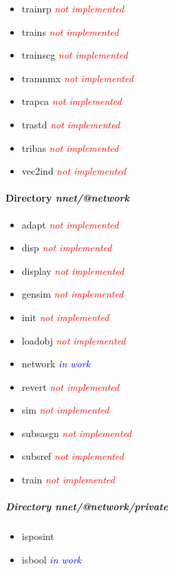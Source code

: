 \begin{itemize}
	\item trainrp \textcolor{red}{\textit{not implemented}}
	\item trains \textcolor{red}{\textit{not implemented}}
	\item trainscg \textcolor{red}{\textit{not implemented}}
	\item tramnmx \textcolor{red}{\textit{not implemented}}
	\item trapca \textcolor{red}{\textit{not implemented}}
	\item trastd \textcolor{red}{\textit{not implemented}}
	\item tribas \textcolor{red}{\textit{not implemented}}
	\item vec2ind \textcolor{red}{\textit{not implemented}}
\end{itemize} 

\paragraph{Directory \textit{nnet/@network}}
\begin{itemize}
	\item adapt \textcolor{red}{\textit{not implemented}}
	\item disp \textcolor{red}{\textit{not implemented}}
	\item display \textcolor{red}{\textit{not implemented}}
	\item gensim \textcolor{red}{\textit{not implemented}}
	\item init \textcolor{red}{\textit{not implemented}}
	\item loadobj \textcolor{red}{\textit{not implemented}}
	\item network \textcolor{blue}{\textit{in work}}
	\item revert \textcolor{red}{\textit{not implemented}}
	\item sim \textcolor{red}{\textit{not implemented}}
	\item subsasgn \textcolor{red}{\textit{not implemented}}
	\item subsref \textcolor{red}{\textit{not implemented}}
	\item train \textcolor{red}{\textit{not implemented}}
\end{itemize}

\subparagraph{Directory \textit{nnet/@network/private}}
\begin{itemize}
	\item isposint 
	\item isbool \textcolor{blue}{\textit{in work}}
\end{itemize}

